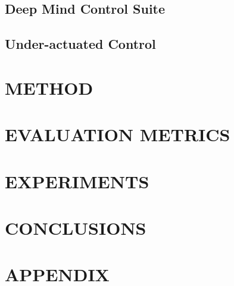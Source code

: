 \documentclass[letterpaper, 10 pt, conference]{ieeeconf}  %
\begin{document}
\subsection{Deep Mind Control Suite}

\subsection{Under-actuated Control}

\section{METHOD}

\lipsum[1]

\section{EVALUATION METRICS}

\lipsum[1]

\section{EXPERIMENTS}

\lipsum[1]

\section{CONCLUSIONS}

\lipsum[1]

\addtolength{\textheight}{-12cm}   %







\section*{APPENDIX}
\end{document}
